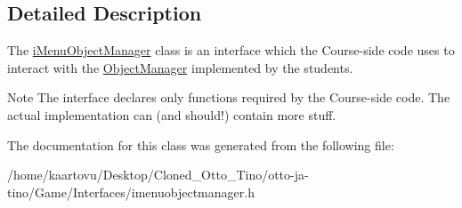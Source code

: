 \subsection{Detailed Description}
The \hyperlink{class_student_1_1i_menu_object_manager}{i\-Menu\-Object\-Manager} class is an interface which the Course-\/side code uses to interact with the \hyperlink{class_student_1_1_object_manager}{Object\-Manager} implemented by the students. 

\begin{DoxyNote}{Note}
The interface declares only functions required by the Course-\/side code. The actual implementation can (and should!) contain more stuff. 
\end{DoxyNote}


The documentation for this class was generated from the following file\-:\begin{DoxyCompactItemize}
\item 
/home/kaartovu/\-Desktop/\-Cloned\-\_\-\-Otto\-\_\-\-Tino/otto-\/ja-\/tino/\-Game/\-Interfaces/imenuobjectmanager.\-h\end{DoxyCompactItemize}
